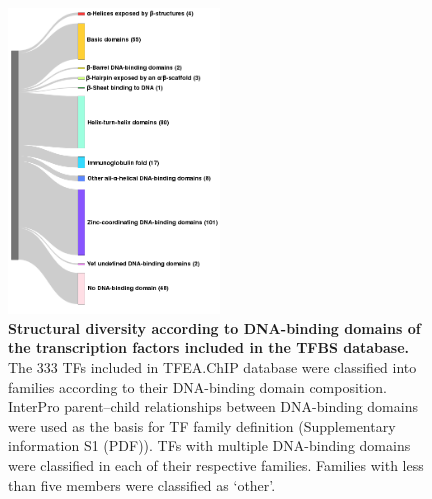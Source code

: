 \documentclass[10pt,letterpaper]{article}
\begin{document}
	\begin{figure}[!h]
		\centering
		\includegraphics[width=0.5\textwidth]{superclases}
		\caption{{\bf Structural diversity according to DNA-binding domains of the transcription factors included in the TFBS database.} The 333 TFs included in TFEA.ChIP database were classified into families according to their DNA-binding domain composition. InterPro parent–child relationships between DNA-binding domains were used as the basis for TF family definition (Supplementary information S1 (PDF)). TFs with multiple DNA-binding domains were classified in each of their respective families. Families with less than five members were classified as ‘other’.}
		\label{fig1}
	\end{figure} 
	
\end{document}
